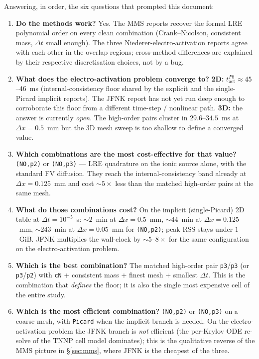 \documentclass[11pt,a4paper]{article}
\newcommand{\tact}{t_{\text{act}}^{P8}}
\newcommand{\code}[1]{\texttt{\small #1}}
\begin{document}
Answering, in order, the six questions that prompted this document:

\begin{enumerate}[leftmargin=*]
\item \textbf{Do the methods work?} Yes. The MMS reports recover the
formal LRE polynomial order on every clean combination
(Crank--Nicolson, consistent mass, $\Delta t$ small enough). The three
Niederer-electro-activation reports agree with each other in the
overlap regions; cross-method differences are explained by their
respective discretisation choices, not by a bug.
\item \textbf{What does the electro-activation problem converge to?}
\textbf{2D:} $\tact \approx 45$--$46$~ms (internal-consistency floor
shared by the explicit and the single-Picard implicit reports). The
JFNK report has not yet run deep enough to corroborate this floor
from a different time-step / nonlinear path. \textbf{3D:} the answer
is currently \emph{open}. The high-order pairs cluster in
$29.6$--$34.5$~ms at $\Delta x = 0.5$~mm but the 3D mesh sweep is too
shallow to define a converged value.
\item \textbf{Which combinations are the most cost-effective for that
value?} \code{(NO,p2)} or \code{(NO,p3)} --- LRE quadrature on the
ionic source alone, with the standard FV diffusion. They reach the
internal-consistency band already at $\Delta x = 0.125$~mm and cost
$\sim 5\times$ less than the matched high-order pairs at the same
mesh.
\item \textbf{What do those combinations cost?} On the implicit
(single-Picard) 2D table at $\Delta t = 10^{-5}$~s: $\sim 2$~min at
$\Delta x = 0.5$~mm, $\sim 44$~min at $\Delta x = 0.125$~mm,
$\sim 243$~min at $\Delta x = 0.05$~mm for \code{(NO,p2)}; peak RSS
stays under $1$~GiB. JFNK multiplies the wall-clock by
$\sim 5$--$8\times$ for the same configuration on the
electro-activation problem.
\item \textbf{Which is the best combination?} The matched
high-order pair \code{p3}/\code{p3} (or \code{p3}/\code{p2}) with
\code{cN} + consistent mass + finest mesh + smallest $\Delta t$. This
is the combination that \emph{defines} the floor; it is also the
single most expensive cell of the entire study.
\item \textbf{Which is the most efficient combination?}
\code{(NO,p2)} or \code{(NO,p3)} on a coarse mesh, with \code{Picard}
when the implicit branch is needed. On the electro-activation problem
the JFNK branch is \emph{not} efficient (the per-Krylov ODE re-solve
of the TNNP cell model dominates); this is the qualitative reverse of
the MMS picture in \S\ref{sec:mms}, where JFNK is the cheapest of
the three.
\end{enumerate}
\end{document}
